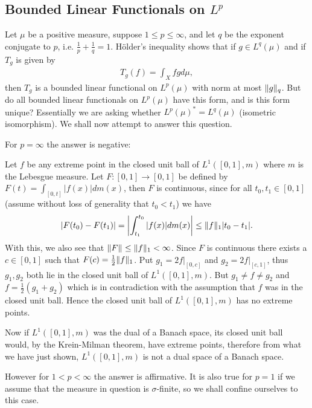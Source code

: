 \subsection{Bounded Linear Functionals on $L^{p}$}
Let $\mu$ be a positive measure, suppose $1\le p \le \infty$, and let $q$ be the exponent conjugate to $p$, i.e. $\frac{1}{p}+\frac{1}{q}=1$. Hölder's inequality shows that if $g\in L^{q}(\mu)$ and if $T_{g}$ is given by
\begin{align*}
	T_{g}(f)=\int_{X}fgd\mu,
\end{align*}
then $T_{g}$ is a bounded linear functional on $L^{p}(\mu)$ with norm at most $\norm[q]{g}$. But do all bounded linear functionals on $L^{p}(\mu)$ have this form, and is this form unique? Essentially we are asking whether $L^{p}(\mu)^{*}=L^{q}(\mu)$ (isometric isomorphism). We shall now attempt to answer this question.

For $p=\infty$ the answer is negative: 

Let $f$ be any extreme point in the closed unit ball of $L^{1}([0,1], m)$ where $m$ is the Lebesgue measure. Let $F:[0,1] \to [0,1]$ be defined by $F(t)=\int_{[0,t]}|f(x)|dm(x)$, then $F$ is continuous, since for all $t_{0},t_{1}\in [0,1]$ (assume without loss of generality that $t_{0}<t_{1}$) we have
\begin{align*}
	|F(t_{0})-F(t_{1})|=\left| \int_{t_{1}}^{t_{0}}|f(x)|dm(x) \right| \le \norm[1]{f}|t_{0}-t_{1}|.
\end{align*}
With this, we also see that $\norm{F}\le\norm[1]{f}<\infty$. Since $F$ is continuous there exists a $c\in [0,1]$ such that $F(c)=\frac{1}{2}\norm[1]{f}$.
Put $g_{1}=2f|_{[0,c]}$ and $g_{2}=2f|_{[c,1]}$, thus $g_{1},g_{2}$ both lie in the closed unit ball of $L^{1}([0,1],m)$. But $g_{1}\neq f \neq g_{2}$ and $f=\frac{1}{2}(g_{1}+g_{2})$ which is in contradiction with the assumption that $f$ was in the closed unit ball. Hence the closed unit ball of $L^{1}([0,1], m)$ has no extreme points.

Now if $L^{1}([0,1],m)$ was the dual of a Banach space, its closed unit ball would, by the Krein-Milman theorem, have extreme points, therefore from what we have just shown, $L^{1}([0,1], m)$ is not a dual space of a Banach space.

However for $1<p<\infty$ the answer is affirmative. It is also true for $p=1$ if we assume that the measure in question is $\sigma$-finite, so we shall confine ourselves to this case.

